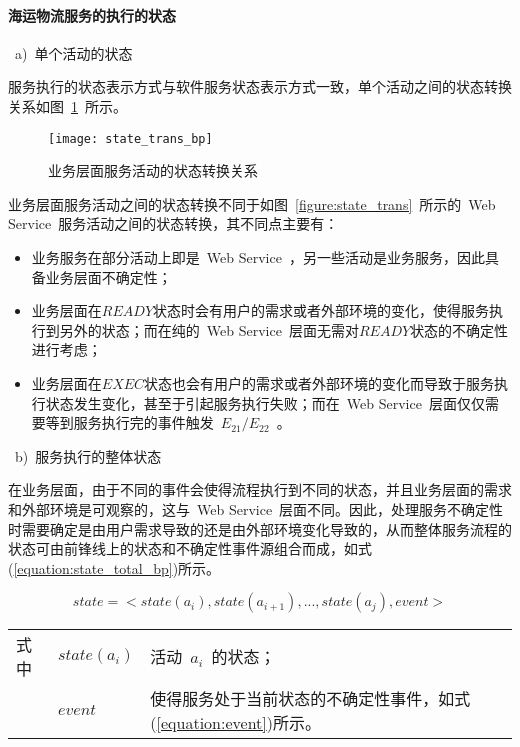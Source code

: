 \paragraph{海运物流服务的执行的状态}

~a)~单个活动的状态

服务执行的状态表示方式与软件服务状态表示方式一致，单个活动之间的状态转换关系如图~\ref{figure:state_trans_pb}~所示。

\begin{figure}[htbp]
    \centering
    \texttt{[image: state\_trans\_bp]}
    \caption{业务层面服务活动的状态转换关系}\label{figure:state_trans_pb}
    \vspace{-1em}
\end{figure}

业务层面服务活动之间的状态转换不同于如图~\ref{figure:state_trans}~所示的~Web Service~服务活动之间的状态转换，其不同点主要有：

\begin{itemize}

\item 业务服务在部分活动上即是~Web Service~，另一些活动是业务服务，因此具备业务层面不确定性；

\item 业务层面在$READY$状态时会有用户的需求或者外部环境的变化，使得服务执行到另外的状态；而在纯的~Web Service~层面无需对$READY$状态的不确定性进行考虑；

\item 业务层面在$EXEC$状态也会有用户的需求或者外部环境的变化而导致于服务执行状态发生变化，甚至于引起服务执行失败；而在~Web Service~层面仅仅需要等到服务执行完的事件触发~$E_{21}/E_{22}$~。

\end{itemize}

~b)~服务执行的整体状态

在业务层面，由于不同的事件会使得流程执行到不同的状态，并且业务层面的需求和外部环境是可观察的，这与~Web Service~层面不同。因此，处理服务不确定性时需要确定是由用户需求导致的还是由外部环境变化导致的，从而整体服务流程的状态可由前锋线上的状态和不确定性事件源组合而成，如式(\ref{equation:state_total_bp})所示。

\begin{equation}\label{equation:state_total_bp}
state = < state(a_i),state(a_{i+1}),..., state(a_j), event >
\end{equation}
\begin{tabularx}{\textwidth}{@{}l@{\quad}l@{\pozhehao }X@{}}
    式中
    & $state(a_i)$ & 活动~$a_i$~的状态；\\
    & $event$ & 使得服务处于当前状态的不确定性事件，如式(\ref{equation:event})所示。
\end{tabularx}\vspace{\wordsep}

